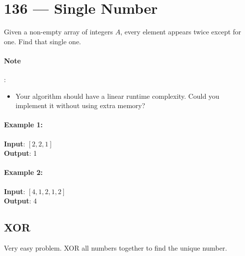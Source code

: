 \section{136 --- Single Number}
Given a non-empty array of integers $A$, every element appears twice except for one. Find that single one.
\paragraph{Note}: 
\begin{itemize}
\item Your algorithm should have a linear runtime complexity. Could you implement it without using extra memory?
\end{itemize}

\paragraph{Example 1:}
\begin{flushleft}
\textbf{Input}: $[2,2,1]$
\\
\textbf{Output}: 1
\end{flushleft}
\paragraph{Example 2:}
\textbf{Input}: $[4,1,2,1,2]$
\\
\textbf{Output}: 4
\subsection{XOR}
Very easy problem.  XOR all numbers together to find the unique number.
